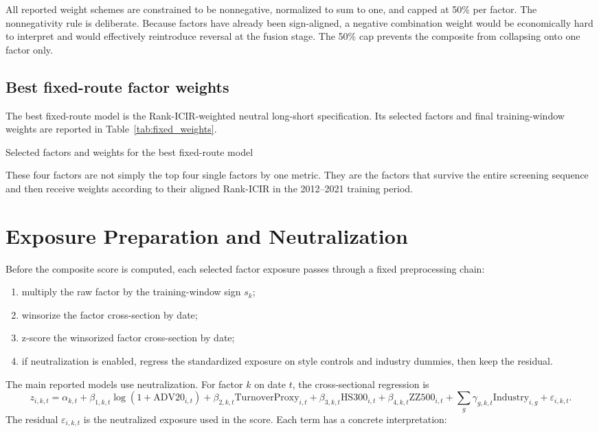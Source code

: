 \documentclass[11pt]{article}
\begin{document}
All reported weight schemes are constrained to be nonnegative, normalized to sum to one, and capped at 50\% per factor. The nonnegativity rule is deliberate. Because factors have already been sign-aligned, a negative combination weight would be economically hard to interpret and would effectively reintroduce reversal at the fusion stage. The 50\% cap prevents the composite from collapsing onto one factor only.

\subsection{Best fixed-route factor weights}

The best fixed-route model is the Rank-ICIR-weighted neutral long-short specification. Its selected factors and final training-window weights are reported in Table~\ref{tab:fixed_weights}.

\begin{table}[H]
\centering
\caption{Selected factors and weights for the best fixed-route model}
\label{tab:fixed_weights}

\end{table}

These four factors are not simply the top four single factors by one metric. They are the factors that survive the entire screening sequence and then receive weights according to their aligned Rank-ICIR in the 2012--2021 training period.

\section{Exposure Preparation and Neutralization}

Before the composite score is computed, each selected factor exposure passes through a fixed preprocessing chain:

\begin{enumerate}
    \item multiply the raw factor by the training-window sign \(s_k\);
    \item winsorize the factor cross-section by date;
    \item z-score the winsorized factor cross-section by date;
    \item if neutralization is enabled, regress the standardized exposure on style controls and industry dummies, then keep the residual.
\end{enumerate}

The main reported models use neutralization. For factor \(k\) on date \(t\), the cross-sectional regression is
\[
z_{i,k,t}
=
\alpha_{k,t}
+ \beta_{1,k,t}\log(1+\text{ADV20}_{i,t})
+ \beta_{2,k,t}\text{TurnoverProxy}_{i,t}
+ \beta_{3,k,t}\text{HS300}_{i,t}
+ \beta_{4,k,t}\text{ZZ500}_{i,t}
+ \sum_g \gamma_{g,k,t}\text{Industry}_{i,g}
+ \varepsilon_{i,k,t}.
\]
The residual \(\varepsilon_{i,k,t}\) is the neutralized exposure used in the score. Each term has a concrete interpretation:
\end{document}
